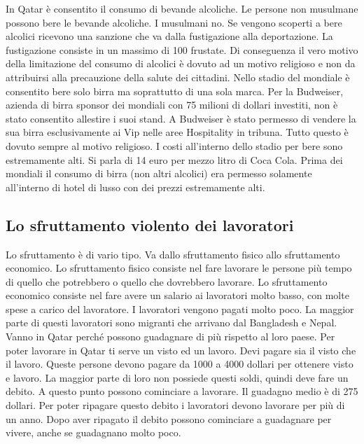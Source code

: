 \documentclass[a4paper, 12pt]{article}
\begin{document}
In Qatar è consentito il consumo di bevande alcoliche. Le persone non musulmane possono bere le bevande alcoliche. I musulmani no. Se vengono scoperti a bere alcolici ricevono una sanzione che va dalla fustigazione alla deportazione. La fustigazione consiste in un massimo di 100 frustate. Di conseguenza il vero motivo della limitazione del consumo di alcolici è dovuto ad un motivo religioso e non da attribuirsi alla precauzione della salute dei cittadini. Nello stadio del mondiale è consentito bere solo birra ma soprattutto di una sola marca. Per la Budweiser, azienda di birra sponsor dei mondiali con 75 milioni di dollari investiti, non è stato consentito allestire i suoi stand. A Budweiser è stato permesso di vendere la sua birra esclusivamente ai Vip nelle aree Hospitality in tribuna. Tutto questo è dovuto sempre al motivo religioso. I costi all'interno dello stadio per bere sono estremamente alti. Si parla di 14 euro per mezzo litro di Coca Cola. Prima dei mondiali il consumo di birra (non altri alcolici) era permesso solamente all'interno di hotel di lusso con dei prezzi estremamente alti. 

\subsection{Lo sfruttamento violento dei lavoratori}

Lo sfruttamento è di vario tipo. Va dallo sfruttamento fisico allo sfruttamento  economico. Lo sfruttamento fisico consiste nel fare lavorare le persone più tempo di quello che potrebbero o quello che dovrebbero lavorare. Lo sfruttamento economico consiste nel fare avere un salario ai lavoratori molto basso, con molte spese a carico del lavoratore. I lavoratori vengono pagati molto poco. La maggior parte di questi lavoratori sono migranti che arrivano dal Bangladesh e Nepal. Vanno in Qatar perché possono guadagnare di più rispetto al loro paese. Per poter lavorare in Qatar ti serve un visto ed un lavoro. Devi pagare sia il visto che il lavoro. Queste persone devono pagare da 1000 a 4000 dollari per ottenere visto e lavoro. La maggior parte di loro non possiede questi soldi, quindi deve fare un debito. A questo punto possono cominciare a lavorare. Il guadagno medio è di 275 dollari. Per poter ripagare questo debito i lavoratori devono lavorare per più di un anno. Dopo aver ripagato il debito possono cominciare a guadagnare per vivere, anche se guadagnano molto poco.

\end{document}
